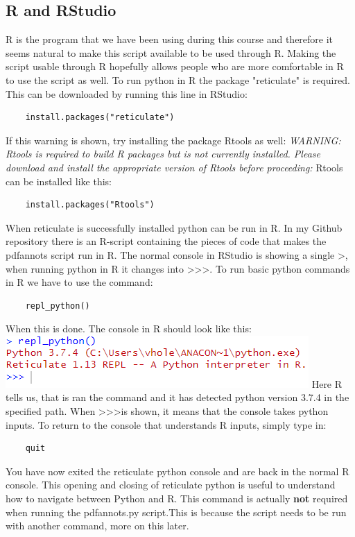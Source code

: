 \documentclass{article}
\begin{document}
\subsection{R and RStudio}
R is the program that we have been using during this course and therefore it seems natural to make this script available to be used through R. Making the script usable through R hopefully allows people who are more comfortable in R to use the script as well. To run python in R the package "reticulate" is required. This can be downloaded by running this line in RStudio:
\begin{verbatim}
    install.packages("reticulate")
\end{verbatim}
If this warning is shown, try installing the package Rtools as well: \textit{WARNING: Rtools is required to build R packages but is not currently installed. Please download and install the appropriate version of Rtools before proceeding:} Rtools can be installed like this:
\begin{verbatim}
    install.packages("Rtools")
\end{verbatim}
When reticulate is successfully installed python can be run in R. In my Github repository there is an R-script containing the pieces of code that makes the pdfannots script run in R. The normal console in RStudio is showing a single \textgreater, when running python in R it changes into \textgreater\textgreater\textgreater. To run basic python commands in R we have to use the command:
\begin{verbatim}
    repl_python()
\end{verbatim}
When this is done. The console in R should look like this: \newline
\includegraphics[scale=1]{repl_python.PNG} \newline
Here R tells us, that is ran the command and it has detected python version 3.7.4 in the specified path. When \textgreater\textgreater\textgreater is shown, it means that the console takes python inputs. To return to the console that understands R inputs, simply type in:
\begin{verbatim}
    quit
\end{verbatim}
You have now exited the reticulate python console and are back in the normal R console. This opening and closing of reticulate python is useful to understand how to navigate between Python and R. This command is actually \textbf{not} required when running the pdfannots.py script.This is because the script needs to be run with another command, more on this later.\newline
\end{document}

